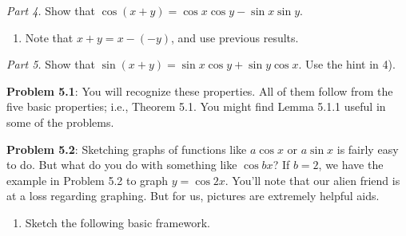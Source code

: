 \documentclass[english]{book}
\begin{document}
\emph{Part 4.} Show that $\cos(x+y) = \cos x\cos y - \sin x\sin y$.
\begin{enumerate}[\hspace{1cm}1)]
  \item Note that $x+y = x-(-y)$, and use previous results.
\end{enumerate}

\emph{Part 5.} Show that $\sin(x+y) = \sin x\cos y + \sin y\cos x$. Use the hint in 4).

\vspace{0.3cm}

\textbf{Problem 5.1}: You will recognize these properties. All of them follow from the five basic properties; i.e., Theorem 5.1. You might find Lemma 5.1.1 useful in some of the problems.

\vspace{0.3cm}

\textbf{Problem 5.2}: Sketching graphs of functions like $a \cos x$ or $a \sin x$ is fairly easy to do. But what do you do with something like $\cos bx$? If $b=2$, we have the example in Problem 5.2 to graph $y = \cos 2x$. You'll note that our alien friend is at a loss regarding graphing. But for us, pictures are extremely helpful aids.

\begin{enumerate}[\hspace{1cm}1)]
  \item Sketch the following basic framework.
\end{enumerate}
\end{document}
